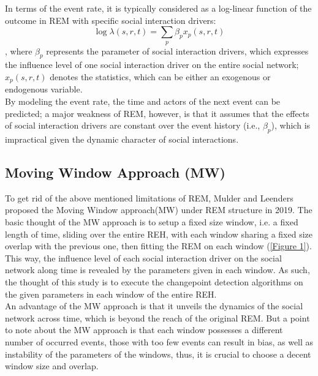 \documentclass[]{interact}
\theoremstyle{plain}%
\theoremstyle{definition}
\theoremstyle{remark}
\begin{document}
In terms of the event rate, it is typically considered as a log-linear function of the outcome in REM with specific social interaction drivers:
\begin{equation} \label{3}
	\log \lambda(s,r,t) = \sum_{p} \beta_p x_p(s,r,t)
\end{equation}
, where $\beta_p$ represents the parameter of social interaction drivers, which expresses the influence level of one social interaction driver on the entire social network; $x_p(s,r,t)$ denotes the statistics, which can be either an exogenous or endogenous variable. \\

By modeling the event rate, the time and actors of the next event can be predicted; a major weakness of REM, however, is that it assumes that the effects of social interaction drivers are constant over the event history (i.e., $\beta_p$), which is impractical given the dynamic character of social interactions.

\subsection{Moving Window Approach (MW)}

\hspace{0.2cm} To get rid of the above mentioned limitations of REM, Mulder and Leenders proposed the Moving Window approach(MW) under REM structure in 2019\cite{mulderModelingEvolutionInteraction2019}. The basic thought of the MW approach is to setup a fixed size window, i.e. a fixed length of time, sliding over the entire REH, with each window sharing a fixed size overlap with the previous one, then fitting the REM on each window (\autoref{Figure 1}). This way, the influence level of each social interaction driver on the social network along time is revealed by the parameters given in each window. As such, the thought of this study is to execute the changepoint detection algorithms on the given parameters in each window of the entire REH. \\ 

An advantage of the MW approach is that it unveils the dynamics of the social network across time, which is beyond the reach of the original REM. But a point to note about the MW approach is that each window possesses a different number of occurred events, those with too few events can result in bias, as well as instability of the parameters of the windows\cite{mulderModelingEvolutionInteraction2019}, thus, it is crucial to choose a decent window size and overlap. \\
\end{document}
